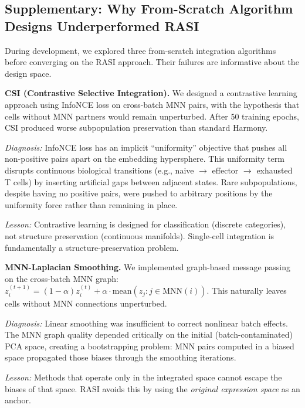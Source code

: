 
\subsection*{Supplementary: Why From-Scratch Algorithm Designs Underperformed RASI}

During development, we explored three from-scratch integration algorithms before converging on the RASI approach. Their failures are informative about the design space.

\textbf{CSI (Contrastive Selective Integration).}
We designed a contrastive learning approach using InfoNCE loss on cross-batch MNN pairs, with the hypothesis that cells without MNN partners would remain unperturbed. After 50 training epochs, CSI produced worse subpopulation preservation than standard Harmony.

\textit{Diagnosis:} InfoNCE loss has an implicit ``uniformity'' objective that pushes all non-positive pairs apart on the embedding hypersphere\cite{wang2020understanding}. This uniformity term disrupts continuous biological transitions (e.g., naive $\to$ effector $\to$ exhausted T cells) by inserting artificial gaps between adjacent states. Rare subpopulations, despite having no positive pairs, were pushed to arbitrary positions by the uniformity force rather than remaining in place.

\textit{Lesson:} Contrastive learning is designed for classification (discrete categories), not structure preservation (continuous manifolds). Single-cell integration is fundamentally a structure-preservation problem.

\textbf{MNN-Laplacian Smoothing.}
We implemented graph-based message passing on the cross-batch MNN graph: $z_i^{(t+1)} = (1-\alpha) z_i^{(t)} + \alpha \cdot \text{mean}(z_j : j \in \text{MNN}(i))$. This naturally leaves cells without MNN connections unperturbed.

\textit{Diagnosis:} Linear smoothing was insufficient to correct nonlinear batch effects. The MNN graph quality depended critically on the initial (batch-contaminated) PCA space, creating a bootstrapping problem: MNN pairs computed in a biased space propagated those biases through the smoothing iterations.

\textit{Lesson:} Methods that operate only in the integrated space cannot escape the biases of that space. RASI avoids this by using the \textit{original expression space} as an anchor.

